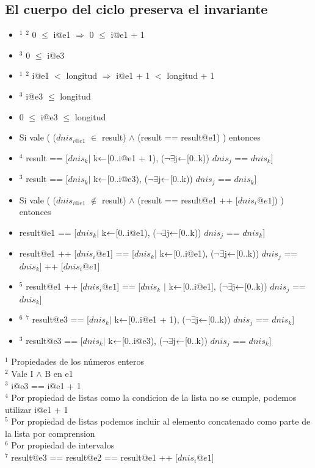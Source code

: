 \subsection{El cuerpo del ciclo preserva el invariante}
\begin{itemize}
	\item $ ^1 $ $ ^2 $ 0 $ \leq $ i@e1 $ \Rightarrow $ 0 $ \leq $ i@e1 + 1
	\item $ ^3 $ 0 $ \leq $ i@e3
	\item $ ^1 $ $^2 $ i@e1 $ < $ longitud $ \Rightarrow $ i@e1 + 1 $ < $ longitud + 1
	\item $ ^3 $ i@e3 $ \leq $ longitud	
	\item \textcolor{NavyBlue}{0 $ \leq $ i@e3 $ \leq $ longitud} \checkmark
	\item Si vale ( ($ dnis_{i@e1} $ $ \in $ result) $ \land $ (result == result@e1) ) entonces
	\item $ ^4 $ result == [$ dnis_k $$|$ k$ \leftarrow $[0..i@e1 + 1), ($ \lnot $$ \exists $j$ \leftarrow $[0..k)) $ dnis_j $ == $ dnis_k $]
	\item $ ^3 $ \textcolor{NavyBlue}{result == [$ dnis_k $$|$ k$ \leftarrow $[0..i@e3), ($ \lnot $$ \exists $j$ \leftarrow $[0..k)) $ dnis_j $ == $ dnis_k $]} \checkmark
	\item Si vale ( ($ dnis_{i@e1} $ $ \notin $ result) $ \land $ (result == result@e1 ++ [$ dnis_i@e1 $]) ) entonces
	\item result@e1 == [$ dnis_k $$|$ k$ \leftarrow $[0..i@e1), ($ \lnot $$ \exists $j$ \leftarrow $[0..k)) $ dnis_j $ == $ dnis_k $]
	\item result@e1 ++ [$ dnis_i@e1 $] == [$ dnis_k $| k$ \leftarrow $[0..i@e1), ($ \lnot $$ \exists $j$ \leftarrow $[0..k)) $ dnis_j $ == $ dnis_k $] ++ [$ dnis_i@e1 $]
	\item $ ^5 $ result@e1 ++ [$ dnis_i@e1 $] == [$ dnis_k $ $|$ k$ \leftarrow $[0..i@e1], ($ \lnot $$ \exists $j$ \leftarrow $[0..k)) $ dnis_j $ == $ dnis_k $]
	\item $ ^6 $ $ ^7 $ result@e3 == [$ dnis_k $$|$ k$ \leftarrow $[0..i@e1 + 1), ($ \lnot $$ \exists $j$ \leftarrow $[0..k)) $ dnis_j $ == $ dnis_k $]
	\item $ ^3 $ \textcolor{NavyBlue}{result@e3 == [$ dnis_k $$|$ k$ \leftarrow $[0..i@e3), ($ \lnot $$ \exists $j$ \leftarrow $[0..k)) $ dnis_j $ == $ dnis_k $]} \checkmark
\end{itemize}
\vspace{3mm}

\noindent $ ^1 $ Propiedades de los números enteros\\
$ ^2 $ Vale I $ \land $ B en e1\\
$ ^3 $ i@e3 == i@e1 + 1\\
$ ^4 $ Por propiedad de listas como la condicion de la lista no se cumple, podemos utilizar i@e1 + 1\\
$ ^5 $ Por propiedad de listas podemos incluir al elemento concatenado como parte de la lista por comprension\\
$ ^6 $ Por propiedad de intervalos\\
$ ^7 $ result@e3 == result@e2 == result@e1 ++ [$ dnis_i@e1 $]\\
